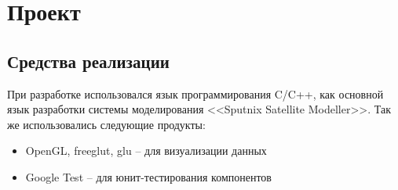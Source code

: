 \section{Проект}
\subsection{Средства реализации}
\noindent\indent При разработке использовался язык программирования C/C++,
как основной язык разработки системы моделирования <<Sputnix Satellite Modeller>>.
Так же использовались следующие продукты:
\begin{itemize}
    \item OpenGL, freeglut, glu -- для визуализации данных
    \item Google Test -- для юнит-тестирования компонентов
\end{itemize}
